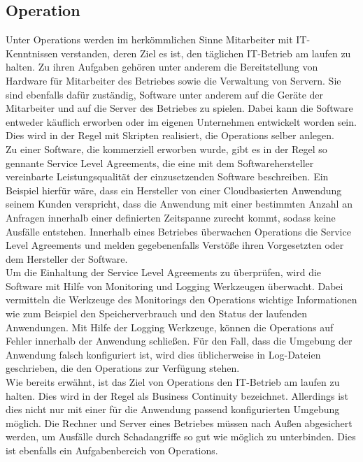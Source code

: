 \subsection{Operation}
Unter Operations werden im herkömmlichen Sinne Mitarbeiter mit IT-Kenntnissen verstanden, deren Ziel es ist, den täglichen IT-Betrieb am laufen zu halten. Zu ihren Aufgaben gehören unter anderem die Bereitstellung von Hardware für Mitarbeiter des Betriebes sowie die Verwaltung von Servern. Sie sind ebenfalls dafür zuständig, Software unter anderem auf die Geräte der Mitarbeiter und auf die Server des Betriebes zu spielen. Dabei kann die Software entweder käuflich erworben oder im eigenen Unternehmen entwickelt worden sein. Dies wird in der Regel mit Skripten realisiert, die Operations selber anlegen.\\
Zu einer Software, die kommerziell erworben wurde, gibt es in der Regel so gennante Service Level Agreements, die eine mit dem Softwarehersteller vereinbarte Leistungsqualität der einzusetzenden Software beschreiben. Ein Beispiel hierfür wäre, dass ein Hersteller von einer Cloudbasierten Anwendung seinem Kunden verspricht, dass die Anwendung mit einer bestimmten Anzahl an Anfragen innerhalb einer definierten Zeitspanne zurecht kommt, sodass keine Ausfälle entstehen. Innerhalb eines Betriebes überwachen Operations die Service Level Agreements und melden gegebenenfalls Verstöße ihren Vorgesetzten oder dem Hersteller der Software. \\
Um die Einhaltung der Service Level Agreements zu überprüfen, wird die Software mit Hilfe von Monitoring und Logging Werkzeugen überwacht. Dabei vermitteln die Werkzeuge des Monitorings den Operations wichtige Informationen wie zum Beispiel den Speicherverbrauch und den Status der laufenden Anwendungen. Mit Hilfe der Logging Werkzeuge, können die Operations auf Fehler innerhalb der Anwendung schließen. Für den Fall, dass die Umgebung der Anwendung falsch konfiguriert ist, wird dies üblicherweise in Log-Dateien geschrieben, die den Operations zur Verfügung stehen. \\
Wie bereits erwähnt, ist das Ziel von Operations den IT-Betrieb am laufen zu halten. Dies wird in der Regel als Business Continuity bezeichnet. Allerdings ist dies nicht nur mit einer für die Anwendung passend konfigurierten Umgebung möglich. Die Rechner und Server eines Betriebes müssen nach Außen abgesichert werden, um Ausfälle durch Schadangriffe so gut wie möglich zu unterbinden. Dies ist ebenfalls ein Aufgabenbereich von Operations.

